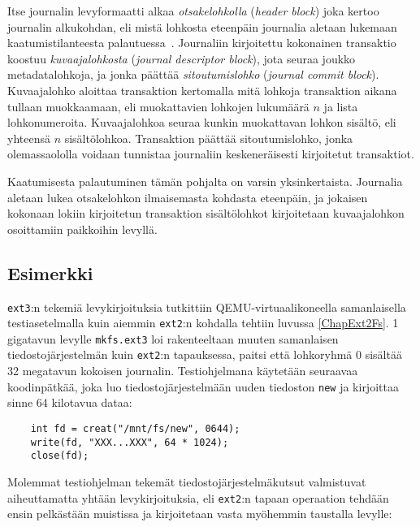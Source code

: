 Itse journalin levyformaatti alkaa \emph{otsakelohkolla} (\emph{header block}) joka kertoo journalin alkukohdan,
eli mistä lohkosta eteenpäin journalia aletaan lukemaan kaatumistilanteesta palautuessa~\cite{JournalingAnalysis}.
Journaliin kirjoitettu kokonainen transaktio koostuu \emph{kuvaajalohkosta} (\emph{journal descriptor block}),
jota seuraa joukko metadatalohkoja,
ja jonka päättää \emph{sitoutumislohko} (\emph{journal commit block}).
Kuvaajalohko aloittaa transaktion kertomalla mitä lohkoja transaktion aikana tullaan muokkaamaan,
eli muokattavien lohkojen lukumäärä $n$ ja lista lohkonumeroita.
Kuvaajalohkoa seuraa kunkin muokattavan lohkon sisältö, eli yhteensä $n$ sisältölohkoa.
Transaktion päättää sitoutumislohko,
jonka olemassaololla voidaan tunnistaa journaliin keskeneräisesti kirjoitetut transaktiot.

Kaatumisesta palautuminen tämän pohjalta on varsin yksinkertaista.
Journalia aletaan lukea otsakelohkon ilmaisemasta kohdasta eteenpäin,
ja jokaisen kokonaan lokiin kirjoitetun transaktion sisältölohkot kirjoitetaan kuvaajalohkon osoittamiin paikkoihin levyllä.

\subsection{Esimerkki}
\texttt{ext3}:n tekemiä levykirjoituksia tutkittiin QEMU-virtuaalikoneella samanlaisella testiasetelmalla kuin aiemmin \texttt{ext2}:n kohdalla tehtiin luvussa \ref{ChapExt2Fs}.
1 gigatavun levylle \texttt{mkfs.ext3} loi rakenteeltaan muuten samanlaisen tiedostojärjestelmän kuin \texttt{ext2}:n tapauksessa,
paitsi että lohkoryhmä 0 sisältää 32 megatavun kokoisen journalin.
Testiohjelmana käytetään seuraavaa koodinpätkää,
joka luo tiedostojärjestelmään uuden tiedoston \texttt{new} ja kirjoittaa sinne 64 kilotavua dataa:

\begin{verbatim}
    int fd = creat("/mnt/fs/new", 0644);
    write(fd, "XXX...XXX", 64 * 1024);
    close(fd);
\end{verbatim}

Molemmat testiohjelman tekemät tiedostojärjestelmäkutsut valmistuvat aiheuttamatta yhtään levykirjoituksia,
eli \texttt{ext2}:n tapaan operaation tehdään ensin pelkästään muistissa ja kirjoitetaan vasta myöhemmin taustalla levylle:

